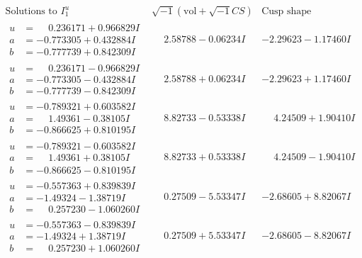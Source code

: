 \documentclass[1p]{elsarticle_modified}
\theoremstyle{definition}
\newcommand{\I}{\sqrt{-1}}
\begin{document}
$$\begin{array}{c|c|c}  
\text{Solutions to }I^u_{1}& \I (\text{vol} + \sqrt{-1}CS) & \text{Cusp shape}\\
 \hline 
\begin{aligned}
u &= \phantom{-}0.236171 + 0.966829 I \\
a &= -0.773305 + 0.432884 I \\
b &= -0.777739 + 0.842309 I\end{aligned}
 & \phantom{-}2.58788 - 0.06234 I & -2.29623 - 1.17460 I \\ \hline\begin{aligned}
u &= \phantom{-}0.236171 - 0.966829 I \\
a &= -0.773305 - 0.432884 I \\
b &= -0.777739 - 0.842309 I\end{aligned}
 & \phantom{-}2.58788 + 0.06234 I & -2.29623 + 1.17460 I \\ \hline\begin{aligned}
u &= -0.789321 + 0.603582 I \\
a &= \phantom{-}1.49361 - 0.38105 I \\
b &= -0.866625 + 0.810195 I\end{aligned}
 & \phantom{-}8.82733 - 0.53338 I & \phantom{-}4.24509 + 1.90410 I \\ \hline\begin{aligned}
u &= -0.789321 - 0.603582 I \\
a &= \phantom{-}1.49361 + 0.38105 I \\
b &= -0.866625 - 0.810195 I\end{aligned}
 & \phantom{-}8.82733 + 0.53338 I & \phantom{-}4.24509 - 1.90410 I \\ \hline\begin{aligned}
u &= -0.557363 + 0.839839 I \\
a &= -1.49324 - 1.38719 I \\
b &= \phantom{-}0.257230 - 1.060260 I\end{aligned}
 & \phantom{-}0.27509 - 5.53347 I & -2.68605 + 8.82067 I \\ \hline\begin{aligned}
u &= -0.557363 - 0.839839 I \\
a &= -1.49324 + 1.38719 I \\
b &= \phantom{-}0.257230 + 1.060260 I\end{aligned}
 & \phantom{-}0.27509 + 5.53347 I & -2.68605 - 8.82067 I \\ \hline\begin{aligned}

\end{aligned}
\end{array}$$
\end{document}
